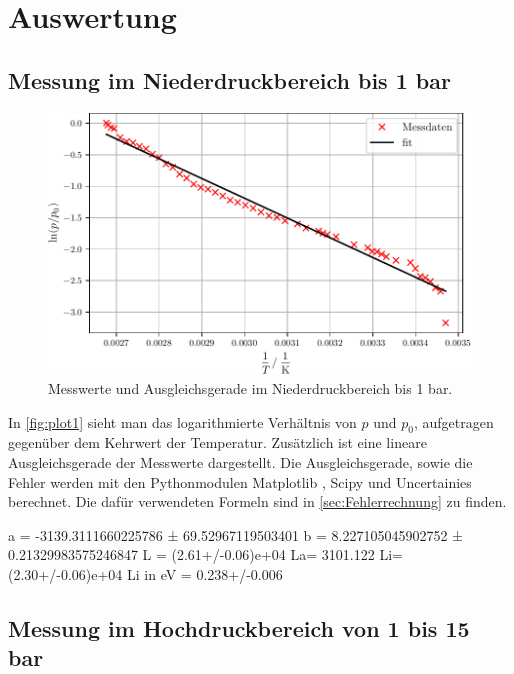 \section{Auswertung}
\label{sec:Auswertung}
\subsection{Messung im Niederdruckbereich bis 1 bar} %
\label{sub:Niederdruck_aus}


\begin{figure}
  \centering
  \includegraphics[scale=0.7]{build/plot1.pdf}
  \caption{Messwerte und Ausgleichsgerade im Niederdruckbereich bis 1 bar.}
  \label{fig:plot1}
\end{figure}

In \autoref{fig:plot1} sieht man das logarithmierte Verhältnis von $p$ und $p_0$, aufgetragen gegenüber dem Kehrwert der Temperatur. 
Zusätzlich ist eine lineare Ausgleichsgerade der Messwerte dargestellt. Die Ausgleichsgerade, sowie die Fehler werden mit den Pythonmodulen Matplotlib \cite{matplotlib}
, Scipy \cite{scipy} und Uncertainies \cite{uncertainties} berechnet. Die dafür verwendeten Formeln sind in \autoref{sec:Fehlerrechnung} zu finden.

a = -3139.3111660225786 ± 69.52967119503401
b = 8.227105045902752 ± 0.21329983575246847
L = (2.61+/-0.06)e+04
La= 3101.122
Li= (2.30+/-0.06)e+04
Li in eV = 0.238+/-0.006

\subsection{Messung im Hochdruckbereich von 1 bis 15 bar} %
\label{sub:Hochdruck_aus}


